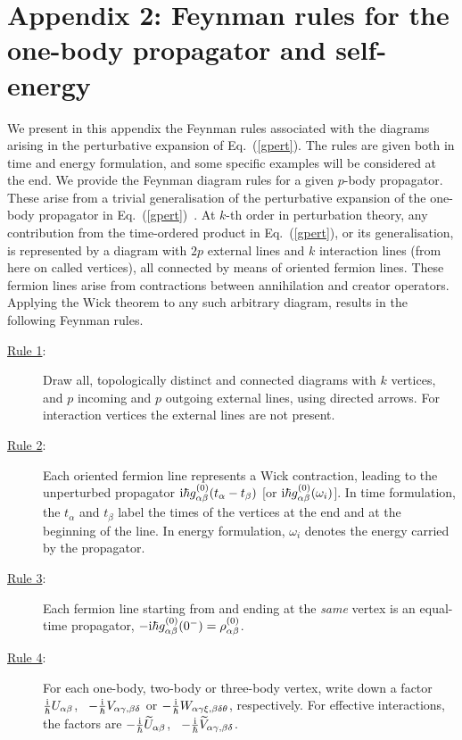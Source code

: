\section*{Appendix 2: Feynman rules for the one-body propagator and self-energy}
\label{app:Feyn_rules}

We present in this appendix the Feynman rules associated with the diagrams arising
in the perturbative expansion of Eq.~(\ref{gpert}). The rules are given both in time and energy formulation, and some specific examples will be considered at the end.
We provide the Feynman diagram rules for a given $p$-body propagator. These arise from a trivial generalisation of the perturbative 
expansion of the one-body propagator in Eq.~(\ref{gpert})~\cite{Carbone2013Nov}. 
At  $k$-th order in perturbation theory, any contribution from the time-ordered product in 
Eq.~(\ref{gpert}), or its generalisation, is represented by a diagram with $2p$ external 
lines and $k$ interaction lines (from here on called vertices), 
all connected by means of oriented fermion lines. 
These fermion lines arise from contractions between annihilation and creator operators.
Applying the Wick theorem to any such arbitrary diagram, results in the following Feynman rules.
\begin{description}
\item[\underline{Rule 1}:] Draw all, topologically distinct and connected diagrams with $k$ vertices, and $p$ incoming and $p$ outgoing external lines, using directed arrows. For interaction vertices the external lines are not present.
\item[\underline{Rule 2}:] Each oriented fermion line represents a Wick contraction, leading to the unperturbed propagator  
${\rm i}\hbar g_{\alpha\beta}^{(0)}(t_\alpha-t_\beta)$ [or ${\rm i}\hbar g_{\alpha\beta}^{(0)}(\omega_i)$]. 
In time formulation, the $t_\alpha$ and $t_\beta$ label the times of the vertices at the end and at the beginning of the line. 
In energy formulation, $\omega_i$ denotes the energy carried by the propagator. 
\item[\underline{Rule 3}:] Each fermion line starting from and ending at the \emph{same} vertex is an 
equal-time propagator,  $-{\rm i}\hbar g_{\alpha\beta}^{(0)}(0^-)=\rho_{\alpha\beta}^{(0)}$.
\item[\underline{Rule 4}:] For each one-body, two-body or three-body vertex, write down a factor $\frac{\rm i}{\hbar} U_{\alpha \beta}$, \, $-\frac{\rm i}{\hbar} V_{\alpha\gamma,\beta\delta}$  or  $-\frac{\rm i}{\hbar} W_{\alpha\gamma\xi,\beta\delta\theta}$, respectively. For effective interactions, the factors are $-\frac{\rm i}{\hbar} \widetilde{U}_{\alpha \beta}$, \, $-\frac{\rm i}{\hbar} \widetilde{V}_{\alpha\gamma,\beta\delta}$.
\end{description}
